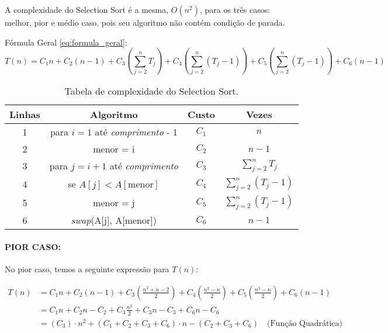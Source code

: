 A complexidade do Selection Sort é a mesma, $O(n^2)$, para os três casos: melhor, pior e médio caso, pois seu algoritmo não contém condição de parada.

Fórmula Geral \ref{eq:formula_geral}:
\begin{equation}
T(n) = C_1n + C_2(n-1) + C_3\left(\sum_{j=2}^{n} T_j \right) + C_4\left(\sum_{j=2}^{n} (T_j - 1) \right) + C_5\left(\sum_{j=2}^{n} (T_j - 1) \right) + C_6(n-1)
\label{eq:formula_geral}
\end{equation}

\begin{table}[H] 
\centering
\begin{tabular}{|c|c|c|c|}
    \hline
    \textbf{Linhas} & \textbf{Algoritmo} & \textbf{Custo} & \textbf{Vezes} \\\hline
    1 & para \(i = 1\) até \textit{comprimento} - 1 & \(C_1\) & \(n\) \\
    2 & \quad menor = i & \(C_2\) & \(n-1\) \\
    3 & \quad para \(j = i + 1\) até \textit{comprimento} & \(C_3\) & \(\sum_{j=2}^{n} T_j\) \\
    4 & \quad se \(A[j] < A[\text{menor}]\) & \(C_4\) & \(\sum_{j=2}^{n} (T_j - 1)\) \\
    5 & \quad menor = j & \(C_5\) & \(\sum_{j=2}^{n} (T_j - 1)\) \\
    6 & \textit{swap}(A[j], A[menor]) & \(C_6\) & \(n-1\) \\
    \hline
\end{tabular}
\caption{Tabela de complexidade do Selection Sort.}
\label{tab:complexidade_selection}
\end{table}



\paragraph{PIOR CASO:}
No pior caso, temos a seguinte expressão para \(T(n)\):

\begin{align}
T(n) &= C_1n + C_2(n-1) + C_3\left( \frac{n^2 + n - 2}{2} \right) + C_4\left( \frac{n^2 - n}{2} \right) + C_5\left( \frac{n^2 - n}{2} \right) + C_6(n - 1) \nonumber \\
&= C_1n+C_2n-C_2+C_3\frac{n^2}{2} + C_3n - C_3 + C_6n-C_6 \nonumber \\
&= (C_3) \cdot n^2 + (C_1 + C_2 + C_3 + C_6) \cdot n - (C_2 + C_3 + C_6) \quad \text{(Função Quadrática)}
\end{align}

